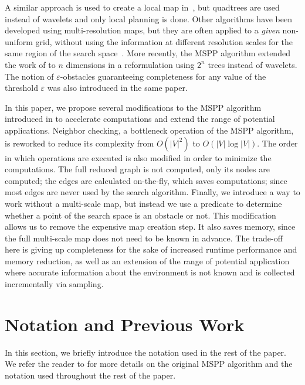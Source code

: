 \documentclass[letterpaper, 10 pt, conference]{ieeeconf}
\theoremstyle{definition}
\begin{document}
A similar approach is used to create a local map in~\cite{behnke2004local}, but quadtrees are used instead of wavelets and only local planning is done. Other algorithms have been developed using multi-resolution maps, but they are often applied to a \textit{given} non-uniform grid, without using the information at different resolution scales for the same region of the search space~\cite{ferguson2006using,petres2007path}.
More recently, the MSPP algorithm \cite{hauer2015multi} extended the work of \cite{cowlagi2011hierarchical} to $n$ dimensions in a reformulation using $2^n$ trees instead of wavelets.
The notion of $\varepsilon$-obstacles guaranteeing completeness for any value of the threshold $\varepsilon$ was also introduced in the same paper.

In this paper, we propose several modifications to the MSPP algorithm introduced in \cite{hauer2015multi} to accelerate computations and extend the range of potential applications.
Neighbor checking, a bottleneck operation of the MSPP algorithm, is reworked to reduce its complexity from $O(\vert V\vert^2)$ to $O(\vert V\vert \log \vert V\vert)$.
The order in which operations are executed is also modified in order to minimize the computations.
The full reduced graph is not computed, only its nodes are computed;
the edges are calculated on-the-fly, which saves computations; since most edges are never used by the search algorithm.
Finally, we introduce a way to work without a multi-scale map, but  instead we use a predicate to determine whether a point of the search space is an obstacle or not.
This modification allows us to remove the expensive map creation step.
It also saves memory, since the full multi-scale map does not need to be known in advance. The trade-off here is giving up completeness for the sake of increased runtime performance and memory reduction, as well as an extension of the range of potential application where accurate information about the environment is not known and is collected incrementally via sampling.




\section{Notation and Previous Work} \label{sec:notations}

In this section, we briefly introduce the notation used in the rest of the paper.  We refer the reader to \cite{hauer2015multi} for more details on the original MSPP algorithm and the notation used throughout the rest of the paper.
\end{document}
